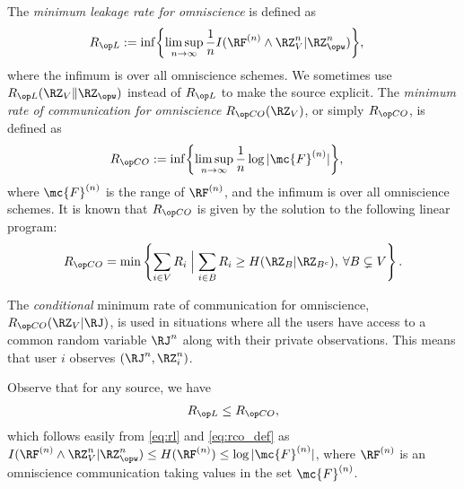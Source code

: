 The \emph{minimum leakage rate for omniscience} is defined as 
\begin{align}
\begin{split}
 \rl&:= \inf  \biggl\lbrace \limsup_{n \to \infty} \frac{1}{n}I(\RF^{(n)} \wedge \RZ_V^n|\RZ_{\opw}^n) \biggr\rbrace, \label{eq:rl}
 \end{split}
\end{align}
where the infimum is over all omniscience schemes. We sometimes use $\rl(\RZ_V\|\RZ_{\opw})$ instead of $\rl$ to make the source explicit. The \emph{minimum rate of communication for omniscience} $\rco(\RZ_V)$, or simply $\rco$, is defined as \cite{csiszar04}
  \begin{align}
    \begin{split}
 \rco&:= \inf  \biggl\lbrace \limsup_{n \to \infty} \frac{1}{n}\log|\mc{F}^{(n)}| \biggr\rbrace, \label{eq:rco_def}
 \end{split}
\end{align}
where $\mc{F}^{(n)}$ is the range of $\RF^{(n)}$, and the infimum is over all omniscience schemes. It is known \cite[Proposition~1]{csiszar04} that $\rco$ is given by the solution to the following linear program:
\begin{align*}
    \rco = \min\left\{\sum \limits_{i \in V} R_i \Bigm\vert \sum \limits_{i \in B}R_i \geq H(\RZ_B|\RZ_{B^c}), \: \forall B\subsetneq V  \right\}.
    \label{rco_expression}
\end{align*}

The \emph{conditional} minimum rate of communication for omniscience, $\rco(\RZ_V|\RJ)$, is used in situations where all the users have access to a common random variable $\RJ^n$ along with  their private observations. This means that user $i$ observes $(\RJ^n, \RZ_i^n)$. 

Observe that for any source, we have
\begin{align}\label{eq:rl_rco}
    \rl  \leq \rco,
\end{align}
which follows easily from \eqref{eq:rl} and \eqref{eq:rco_def} as $I(\RF^{(n)} \wedge \RZ_V^n|\RZ_{\opw}^n)\leq H(\RF^{(n)}) \leq \log|\mc{F}^{(n)}|$, where $\RF^{(n)}$ is an omniscience communication taking values in the set $\mc{F}^{(n)}$. 

